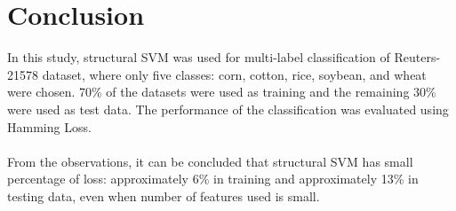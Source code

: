 \section{Conclusion}
In this study, structural SVM was used for multi-label classification of Reuters-21578 dataset, where only five classes: corn, cotton, rice, soybean, and wheat were chosen. 70\% of the datasets were used as training and the remaining 30\% were used as test data. The performance of the classification was evaluated using Hamming Loss.
\\\\
From the observations, it can be concluded that structural SVM has small percentage of loss: approximately 6\% in training and approximately 13\% in testing data, even when number of features used is small.